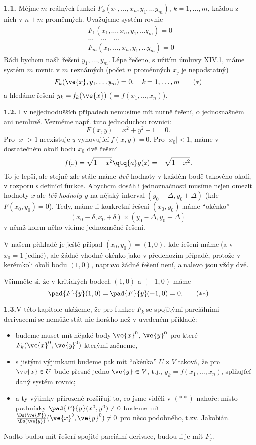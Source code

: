 \documentclass[12pt]{article}
\begin{document}
{{\bf 1.1.} Mějme $m$ reálných funkcí $F_k(x_1,\dots,x_n,y_1,\dots y_m)$, $k=1,\dots,m$, každou z nich v $n+m$ proměnných. Uvažujeme systém rovnic
$$
\begin{aligned}
&F_1(x_1,\dots,x_n,y_1,\dots y_m)=0\\
&\dots\quad\dots\quad\dots\\
&F_m(x_1,\dots,x_n,y_1,\dots y_m)=0
\end{aligned}
$$
Rádi bychom našli řešení $y_1,\dots,y_m$. Lépe řečeno, s užitím úmluvy XIV.1, máme systém  $m$ rovnic v $m$ neznámých (počet  $n$ proměnných $x_j$ je nepodstatný)
\begin{equation}
F_k(\ve{x},y_1,\dots y_m)=0, \quad k=1,\dots,m \tag{$*$}
\end{equation}
a hledáme řešení $y_k=f_k(\ve{x})$ ($=f(x_1,\dots,x_n)$).

\bigskip

{\bf 1.2.} I v nejjednodušších případech nemusíme mít nutně řešení, o jednoznašném ani nemluvě.
Vezměme např. tuto jednoduchou rovnici:
$$
F(x,y)=x^2+y^2-1=0.
$$ 
Pro $|x|>1$ neexistuje $y$ vyhovující $f(x,y)=0$. Pro $|x_0|<1$, 
 máme v dostatečném okolí bodu $x_0$ dvě řešení
$$
f(x)=\sqrt{1-x^2}\qtq{a}g(x)=-\sqrt{1-x^2}.
$$
To je lepší, ale stejně zde stále máme {\em dvě} hodnoty v každém bodě takového okolí,
v rozporu s definicí funkce. Abychom dosáhli jednoznačnosti musíme nejen omezit hodnoty 
 $x$ ale {\em též hodnoty $y$} 
na nějaký interval $(y_0-\Delta,y_0+\Delta)$ (kde$F(x_0,y_0)=0$). Tedy, 
máme-li konkretní řešení $(x_0,y_0)$ máme ``okénko''
$$
(x_0-\delta,x_0+\delta)\times(y_0-\Delta,y_0+\Delta)
$$
v němž kolem něho vidíme jednoznačné řešení.

V našem příkladě
je ještě případ $(x_0,y_0)=(1,0)$, kde řešení máme (a v $x_0=1$ jediné),
ale žádné vhodné okénko jako v předchozím případě, protože
v kerémkoli okolí bodu $(1,0)$,
napravo žádné řešení není, a nalevo jsou vždy dvě.

\smallskip

Všimněte si, že v kritických bodech $(1,0)$ a $(-1,0)$ máme
\begin{equation}
\pad{F}{y}(1,0)=\pad{F}{y}(-1,0)=0. \tag{$**$}
\end{equation}


\bigskip

{\bf 1.3.}V této kapitole ukážeme, že pro funkce $F_k$ se spojitými parciálními derivacemi se nemůže stát nic horšího než v uvedeném příkladě:
\begin{itemize}
\item budeme muset mít nějaké body $\ve{x}^0$, $\ve{y}^0$ pro které $F_k(\ve{x}^0,\ve{y}^0)$ kterými začneme,
\item s jistými výjimkami budeme pak mít ``okénka'' $U\times V$ taková, že pro $\ve{x}\in U$ bude přesně jedno $\ve{y}\in V$, t.j.,
$y_k=f(x_1,\dots,x_n)$, splňující daný systém rovnic;
\item a ty výjimky přirozeně rozšiřují to, co jsme viděli v $(**)$ nahoře: místo podmínky $\pad{F}{y}(x^0,y^0)\neq 0$ budeme mít
$\frac{\Ds(\ve{F})}{\Ds(\ve{y})}(\ve{x}^0,\ve{y}^0)\neq 0$ pro něco podobného, t.zv. Jakobián.
\end{itemize}
Nadto budou mít řešení spojité parciální derivace, budou-li je mít $F_j$.

}
\end{document}
